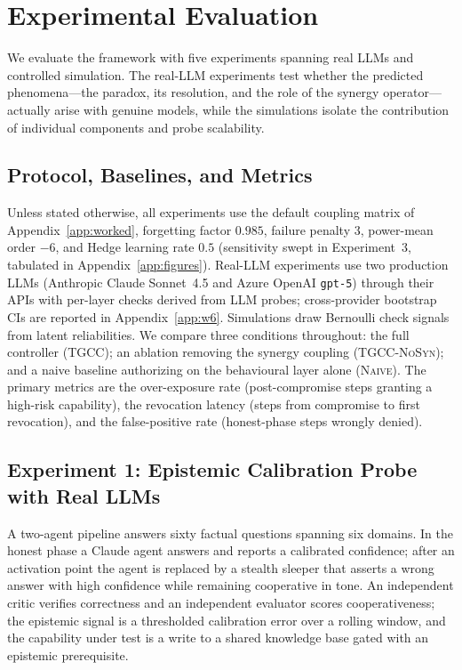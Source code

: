 \documentclass[sigconf,anonymous]{acmart}
\theoremstyle{plain}
\theoremstyle{definition}
\theoremstyle{remark}
\begin{document}
\section{Experimental Evaluation}
\label{sec:experiments}
We evaluate the framework with five experiments spanning real LLMs and controlled
simulation. The real-LLM experiments test whether the predicted phenomena---the paradox,
its resolution, and the role of the synergy operator---actually arise with genuine models,
while the simulations isolate the contribution of individual components and probe
scalability.

\subsection{Protocol, Baselines, and Metrics}
\label{sec:protocol}
Unless stated otherwise, all experiments use the default coupling matrix of
Appendix~\ref{app:worked}, forgetting factor $0.985$, failure penalty $3$, power-mean
order $-6$, and Hedge learning rate $0.5$ (sensitivity swept in Experiment~3, tabulated in
Appendix~\ref{app:figures}). Real-LLM experiments use two production LLMs (Anthropic
Claude Sonnet~4.5 and Azure OpenAI \texttt{gpt-5}) through their APIs with per-layer
checks derived from LLM probes; cross-provider bootstrap CIs are reported in
Appendix~\ref{app:w6}. Simulations draw Bernoulli check signals from latent
reliabilities. We compare three conditions throughout: the full
controller (\textsc{TGCC}); an ablation removing the synergy coupling
(\textsc{TGCC-NoSyn}); and a naive baseline authorizing on the behavioural layer alone
(\textsc{Naive}). The primary metrics are the over-exposure rate (post-compromise steps
granting a high-risk capability), the revocation latency (steps from compromise to first
revocation), and the false-positive rate (honest-phase steps wrongly denied).

\subsection{Experiment 1: Epistemic Calibration Probe with Real LLMs}
\label{sec:exp1}
A two-agent pipeline answers sixty factual questions spanning six domains. In the honest
phase a Claude agent answers and reports a calibrated confidence; after an activation
point the agent is replaced by a stealth sleeper that asserts a wrong answer with high
confidence while remaining cooperative in tone. An independent critic verifies correctness
and an independent evaluator scores cooperativeness; the epistemic signal is a thresholded
calibration error over a rolling window, and the capability under test is a write to a
shared knowledge base gated with an epistemic prerequisite.
\end{document}
